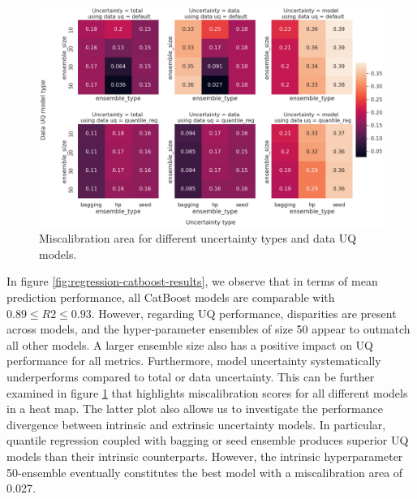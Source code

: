 \begin{figure}[!htbp]
    \centering
    \includegraphics[width=0.95\linewidth]{figures/eval/uqlearn/regression-catboost-heatmap.png}
    \caption{Miscalibration area for different uncertainty types and data UQ models.}
    \label{fig:regression-catboost-heatmap}
\end{figure}

In figure \ref{fig:regression-catboost-results}, we observe that in terms of mean prediction performance, all CatBoost models are comparable with $0.89 \leq R2 \leq 0.93$. However, regarding UQ performance, disparities are present across models, and the hyper-parameter ensembles of size 50 appear to outmatch all other models. A larger ensemble size also has a positive impact on UQ performance for all metrics. Furthermore, model uncertainty systematically underperforms compared to total or data uncertainty. This can be further examined in figure \ref{fig:regression-catboost-heatmap} that highlights miscalibration scores for all different models in a heat map. The latter plot also allows us to investigate the performance divergence between intrinsic and extrinsic uncertainty models. In particular, quantile regression coupled with bagging or seed ensemble produces superior UQ models than their intrinsic counterparts. However, the intrinsic hyperparameter 50-ensemble eventually constitutes the best model with a miscalibration area of 0.027.


